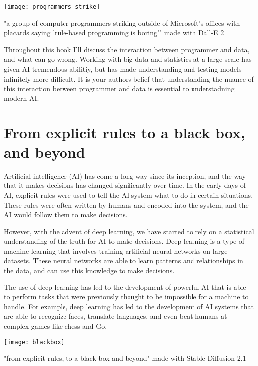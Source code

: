 \begin{marginfigure}[-5.5cm]
        \texttt{[image: programmers\_strike]}
        \caption{"a group of computer programmers striking outside of Microsoft's offices with placards saying 'rule-based programming is boring'" made with Dall-E 2}
\end{marginfigure}

Throughout this book I'll discuss the interaction between programmer and data, and what can go wrong. Working with big data and statistics at a large scale has given AI tremendous abilitiy, but has made understanding and testing models infinitely more difficult. It is your authors belief that understanding the nuance of this interaction between programmer and data is essential to understadning modern AI.

\section{From explicit rules to a black box, and beyond}

Artificial intelligence (AI) has come a long way since its inception, and the way that it makes decisions has changed significantly over time. In the early days of AI, explicit rules were used to tell the AI system what to do in certain situations. These rules were often written by humans and encoded into the system, and the AI would follow them to make decisions.

However, with the advent of deep learning, we have started to rely on a statistical understanding of the truth for AI to make decisions. Deep learning is a type of machine learning that involves training artificial neural networks on large datasets. These neural networks are able to learn patterns and relationships in the data, and can use this knowledge to make decisions.

The use of deep learning has led to the development of powerful AI that is able to perform tasks that were previously thought to be impossible for a machine to handle. For example, deep learning has led to the development of AI systems that are able to recognize faces, translate languages, and even beat humans at complex games like chess and Go.

\begin{marginfigure}[-5.5cm]
        \texttt{[image: blackbox]}
        \caption{"from explicit rules, to a black box and beyond" made with Stable Diffusion 2.1}
\end{marginfigure}

